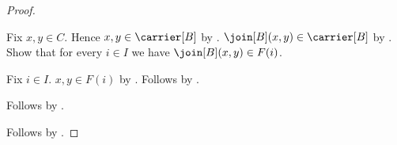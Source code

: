 \begin{proof}
    \begin{subproof}
        Fix $x,y\in C$.
        Hence $x,y\in\carrier[B]$ by .
        $\join[B](x,y)\in\carrier[B]$ by
            .
        Show that for every $i\in I$ we have $\join[B](x,y)\in F(i)$.
        \begin{subproof}
            Fix $i\in I$.
            $x,y\in F(i)$ by .
            Follows by .
        \end{subproof}
        Follows by .
    \end{subproof}
    Follows by .
\end{proof}

